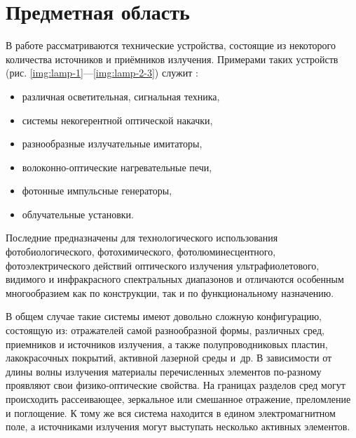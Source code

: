 \section{Предметная область}

В работе рассматриваются технические устройства, состоящие из некоторого количества источников и приёмников излучения.
Примерами таких устройств (рис. \ref{img:lamp-1}—\ref{img:lamp-2-3}) служит \cite{lighting-engineering, lasers, neodymium-glass-lasers, sarychev}:
\begin{itemize}
	\item различная осветительная, сигнальная техника,
	\item системы некогерентной оптической накачки,
	\item разнообразные излучательные имитаторы,
	\item волоконно-оптические нагревательные печи,
	\item фотонные импульсные генераторы,
	\item облучательные установки.
\end{itemize}



Последние предназначены для технологического использования фотобиологического, фотохимического, фотолюминесцентного, фотоэлектрического действий оптического излучения ультрафиолетового, видимого и инфракрасного спектральных диапазонов и отличаются особенным многообразием как по конструкции, так и по функциональному назначению.

В общем случае такие системы имеют довольно сложную конфигурацию, состоящую из:
отражателей самой разнообразной формы, различных сред, приемников и источников излучения, а также полупроводниковых пластин, лакокрасочных покрытий, активной лазерной среды и~др.
В зависимости от длины волны излучения материалы перечисленных элементов по-разному проявляют свои физико-оптические свойства.
На границах разделов сред могут происходить рассеивающее, зеркальное или смешанное отражение, преломление и поглощение.
К тому же вся система находится в едином электромагнитном поле, а источниками излучения могут выступать несколько активных элементов.

